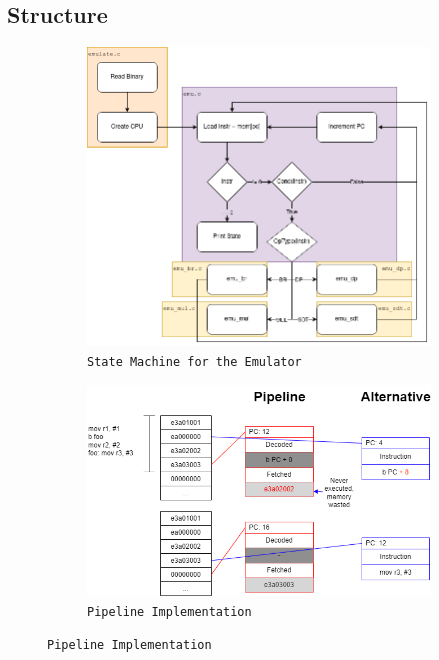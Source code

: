 \documentclass[11pt]{article}
\begin{document}
\subsection{Structure}
\begin{figure}
  \centering
  \begin{subfigure}[b]{0.5\textwidth}
    \centering
    \includegraphics[width=\textwidth]{interim/arch.png}
    \caption*{\texttt{State Machine for the Emulator}}
  \end{subfigure}
  \hfill
  \begin{subfigure}[b]{0.4\textwidth}
    \centering
    \includegraphics[width=\textwidth]{interim/pipeline.png}
    \caption*{\texttt{Pipeline Implementation}}
  \end{subfigure}
\end{figure}
\end{document}
